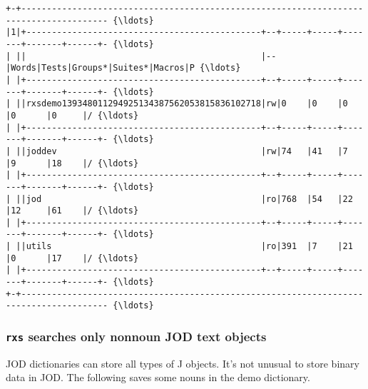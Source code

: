 \documentclass[11pt,letter,landscape]{article}
\begin{document}
    \begin{Verbatim}[commandchars=\\\{\}]
+-+--------------------------------------------------------------------------------------- {\ldots} 
|1|+----------------------------------------------+--+-----+-----+-------+-------+------+- {\ldots} 
| ||                                              |--|Words|Tests|Groups*|Suites*|Macros|P {\ldots} 
| |+----------------------------------------------+--+-----+-----+-------+-------+------+- {\ldots} 
| ||rxsdemo139348011294925134387562053815836102718|rw|0    |0    |0      |0      |0     |/ {\ldots} 
| |+----------------------------------------------+--+-----+-----+-------+-------+------+- {\ldots} 
| ||joddev                                        |rw|74   |41   |7      |9      |18    |/ {\ldots} 
| |+----------------------------------------------+--+-----+-----+-------+-------+------+- {\ldots} 
| ||jod                                           |ro|768  |54   |22     |12     |61    |/ {\ldots} 
| |+----------------------------------------------+--+-----+-----+-------+-------+------+- {\ldots} 
| ||utils                                         |ro|391  |7    |21     |0      |17    |/ {\ldots} 
| |+----------------------------------------------+--+-----+-----+-------+-------+------+- {\ldots} 
+-+--------------------------------------------------------------------------------------- {\ldots} 

    \end{Verbatim}

    \subsubsection{\texorpdfstring{\texttt{rxs} searches only nonnoun JOD
text
objects}{rxs searches only nonnoun JOD text objects}}\label{rxs-searches-only-nonnoun-jod-text-objects}

JOD dictionaries can store all types of J objects. It's not unusual to
store binary data in JOD. The following saves some nouns in the demo
dictionary.
\end{document}
